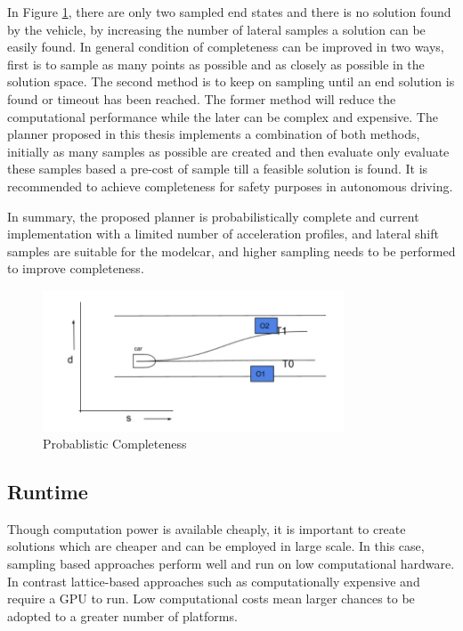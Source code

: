 In Figure \ref{probablistically_complete}, there are only two sampled end states and there is no solution found by the vehicle, by increasing the number of lateral samples a solution can be easily found. In general condition of completeness can be improved in two ways, first is to sample as many points as possible and as closely as possible in the solution space. The second method is to keep on sampling until an end solution is found or timeout has been reached. The former method will reduce the computational performance while the later can be complex and expensive. The planner proposed in this thesis implements a combination of both methods, initially as many samples as possible are created and then evaluate only evaluate these samples based a pre-cost of sample till a feasible solution is found. It is recommended to achieve completeness for safety purposes in autonomous driving.


In summary, the proposed planner is probabilistically complete and current implementation with a limited number of acceleration profiles, and lateral shift samples are suitable for the modelcar, and higher sampling needs to be performed to improve completeness.  

 \begin{figure}[h]
    \centering
    \includegraphics[width=0.8\textwidth]{Images/probablistically_complete.png}
    \caption{Probablistic Completeness}
    \label{probablistically_complete}
\end{figure}

\subsection{Runtime}

Though computation power is available cheaply, it is important to create solutions which are cheaper and can be employed in large scale. In this case, sampling based approaches perform well and run on low computational hardware. In contrast lattice-based approaches such as \cite{cmu_parallel_thesis} \cite{diss_shui_phd_thesis} \cite{werling_frenet} computationally expensive and require a GPU to run. Low computational costs mean larger chances to be adopted to a greater number of platforms.


